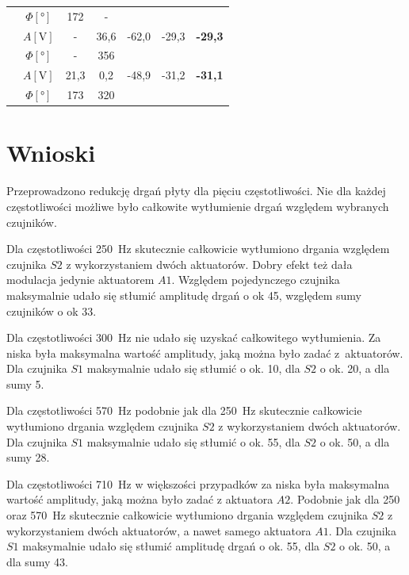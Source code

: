 \documentclass[polish,a4paper,11pt]{mwart}
\let\Oldsection\section
\renewcommand{\section}{\FloatBarrier\Oldsection}
\begin{document}
\begin{table}[!tbh]
\begin{tabular}{|c|c|c|c|c|c|c|}
				       &$\Phi [\si{\degree}]$ & 172 & - & \multicolumn{3}{c}{}\\\cline{2-7}
				       &   $A [\si{\V}]$ & - & 36,6 & -62,0 & -29,3 & \textbf{-29,3} \\\cline{2-7}
				       &$\Phi [\si{\degree}]$ & - & 356 & \multicolumn{3}{c}{}\\\cline{2-7}
				       &   $A [\si{\V}]$ & 21,3 & 0,2 & -48,9 & -31,2 & \textbf{-31,1} \\\cline{2-7}
				       &$\Phi [\si{\degree}]$ & 173 & 320 & \multicolumn{3}{c}{}\\\cline{1-4}
  \end{tabular}
\end{table}

\section{Wnioski}

Przeprowadzono redukcję drgań płyty dla pięciu częstotliwości. Nie dla każdej
częstotliwości możliwe było całkowite wytłumienie drgań względem wybranych
czujników. 

Dla częstotliwości \SI{250}{\hertz} skutecznie całkowicie wytłumiono drgania
względem czujnika $S2$ z wykorzystaniem dwóch aktuatorów. Dobry efekt też dała
modulacja jedynie aktuatorem $A1$. Względem pojedynczego czujnika
maksymalnie udało się stłumić amplitudę drgań o ok \SI{45}{\decibelV}, względem
sumy czujników o ok \SI{33}{\decibelV}.

Dla częstotliwości \SI{300}{\hertz} nie udało się uzyskać całkowitego
wytłumienia. Za niska była maksymalna wartość amplitudy, jaką można było zadać
z~aktuatorów.  Dla czujnika $S1$ maksymalnie udało się stłumić o ok.
\SI{10}{\decibelV}, dla $S2$ o ok. \SI{20}{\decibelV}, a dla sumy
\SI{5}{\decibelV}.

Dla częstotliwości \SI{570}{\hertz} podobnie jak dla \SI{250}{\hertz}
skutecznie całkowicie wytłumiono drgania względem czujnika $S2$ z wykorzystaniem
dwóch aktuatorów. Dla czujnika $S1$ maksymalnie udało się stłumić o ok.
\SI{55}{\decibelV}, dla $S2$ o ok. \SI{50}{\decibelV}, a dla sumy
\SI{28}{\decibelV}.

Dla częstotliwości \SI{710}{\hertz} w większości przypadków za niska była
maksymalna wartość amplitudy, jaką można było zadać z aktuatora $A2$.
Podobnie jak dla 250 oraz \SI{570}{\hertz} skutecznie całkowicie wytłumiono
drgania względem czujnika $S2$ z wykorzystaniem dwóch aktuatorów, a nawet samego
aktuatora $A1$. Dla czujnika $S1$ maksymalnie udało się stłumić
amplitudę drgań o ok. \SI{55}{\decibelV}, dla $S2$ o ok.
\SI{50}{\decibelV}, a dla sumy \SI{43}{\decibelV}.
\end{document}
